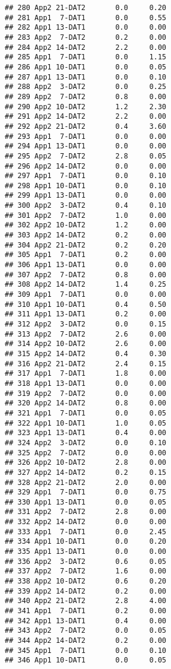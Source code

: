 \documentclass[
]{article}
\begin{document}
\begin{verbatim}
## 280 App2 21-DAT2       0.0     0.20
## 281 App1  7-DAT1       0.0     0.55
## 282 App1 13-DAT1       0.0     0.00
## 283 App2  7-DAT2       0.2     0.00
## 284 App2 14-DAT2       2.2     0.00
## 285 App1  7-DAT1       0.0     1.15
## 286 App1 10-DAT1       0.0     0.05
## 287 App1 13-DAT1       0.0     0.10
## 288 App2  3-DAT2       0.0     0.25
## 289 App2  7-DAT2       0.8     0.00
## 290 App2 10-DAT2       1.2     2.30
## 291 App2 14-DAT2       2.2     0.00
## 292 App2 21-DAT2       0.4     3.60
## 293 App1  7-DAT1       0.0     0.00
## 294 App1 13-DAT1       0.0     0.00
## 295 App2  7-DAT2       2.8     0.05
## 296 App2 14-DAT2       0.0     0.00
## 297 App1  7-DAT1       0.0     0.10
## 298 App1 10-DAT1       0.0     0.10
## 299 App1 13-DAT1       0.0     0.00
## 300 App2  3-DAT2       0.4     0.10
## 301 App2  7-DAT2       1.0     0.00
## 302 App2 10-DAT2       1.2     0.00
## 303 App2 14-DAT2       0.2     0.00
## 304 App2 21-DAT2       0.2     0.20
## 305 App1  7-DAT1       0.2     0.00
## 306 App1 13-DAT1       0.0     0.00
## 307 App2  7-DAT2       0.8     0.00
## 308 App2 14-DAT2       1.4     0.25
## 309 App1  7-DAT1       0.0     0.00
## 310 App1 10-DAT1       0.4     0.50
## 311 App1 13-DAT1       0.2     0.00
## 312 App2  3-DAT2       0.0     0.15
## 313 App2  7-DAT2       2.6     0.00
## 314 App2 10-DAT2       2.6     0.00
## 315 App2 14-DAT2       0.4     0.30
## 316 App2 21-DAT2       2.4     0.15
## 317 App1  7-DAT1       1.8     0.00
## 318 App1 13-DAT1       0.0     0.00
## 319 App2  7-DAT2       0.0     0.00
## 320 App2 14-DAT2       0.8     0.00
## 321 App1  7-DAT1       0.0     0.05
## 322 App1 10-DAT1       1.0     0.05
## 323 App1 13-DAT1       0.4     0.00
## 324 App2  3-DAT2       0.0     0.10
## 325 App2  7-DAT2       0.0     0.00
## 326 App2 10-DAT2       2.8     0.00
## 327 App2 14-DAT2       0.2     0.15
## 328 App2 21-DAT2       2.0     0.00
## 329 App1  7-DAT1       0.0     0.75
## 330 App1 13-DAT1       0.0     0.05
## 331 App2  7-DAT2       2.8     0.00
## 332 App2 14-DAT2       0.0     0.00
## 333 App1  7-DAT1       0.0     2.45
## 334 App1 10-DAT1       0.0     0.20
## 335 App1 13-DAT1       0.0     0.00
## 336 App2  3-DAT2       0.6     0.05
## 337 App2  7-DAT2       1.6     0.00
## 338 App2 10-DAT2       0.6     0.20
## 339 App2 14-DAT2       0.2     0.00
## 340 App2 21-DAT2       2.8     4.00
## 341 App1  7-DAT1       0.2     0.00
## 342 App1 13-DAT1       0.4     0.00
## 343 App2  7-DAT2       0.0     0.05
## 344 App2 14-DAT2       0.2     0.00
## 345 App1  7-DAT1       0.0     0.10
## 346 App1 10-DAT1       0.0     0.05

\end{verbatim}
\end{document}
